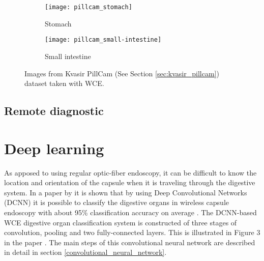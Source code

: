 \documentclass[thesis.tex]{subfiles}
\begin{document}
\begin{figure} %
  \centering
  \begin{subfigure}[b]{0.4\linewidth}
    \centering
    \texttt{[image: pillcam\_stomach]}
    \caption{Stomach}
    \label{fig:pillcam_stomach}
  \end{subfigure}
  \quad
  \begin{subfigure}[b]{0.4\linewidth}
    \centering
    \texttt{[image: pillcam\_small-intestine]}
    \caption{Small intestine}
    \label{fig:pillcam_colon}
  \end{subfigure}
  \caption[Images taken with WCE]{Images from Kvasir PillCam (See Section \ref{sec:kvasir_pillcam}) dataset taken with WCE.}
  \label{fig:pillcam_examples}
\end{figure}



\subsection{Remote diagnostic}  \label{sec:remote_diagnostic}






\newpage
\section{Deep learning} \label{sec:deep_learning}
As apposed to using regular optic-fiber endoscopy, it can be difficult to know the location and orientation of the capsule when it is traveling through the digestive system. In a paper by \citeauthor*{ClassifyingDigestive15} it is shown that by using Deep Convolutional Networks (DCNN) it is possible to classify the digestive organs in wireless capsule endoscopy with about 95\% classification accuracy on average \cite{ClassifyingDigestive15}.
The DCNN-based WCE digestive organ classification system is constructed of three stages of convolution, pooling and two fully-connected layers. This is illustrated in Figure 3 in the paper \cite{ClassifyingDigestive15}. The main steps of this convolutional neural network are described in detail in section \ref{convolutional_neural_network}.
\end{document}
